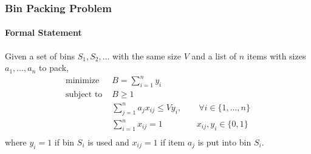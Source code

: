 \documentclass[10pt,    %
    english,            %
    xcolor=table,       %
    envcountsect,        %
    aspectratio=169     %
]{beamer}
\begin{document}
\begin{frame}
    \frametitle{Bin Packing Problem}
    \framesubtitle{Formal Statement}

    \vspace{-10pt}

    Given a set of bins $S_1, S_2, \dots$ with the same size $V$ and a list of $n$ items with sizes $a_1, \dots, a_n$ to pack,
    \begin{equation*}
        \begin{aligned}
            \text{minimize } & B = \sum\limits_{i = 1}^{n} y_i \\
            \text{subject to } & B \geq 1 \\
            & \sum\limits_{j = 1}^{n}a_jx_{ij} \leq V y_i, \quad \quad \forall i \in \lbrace 1, \dots, n\rbrace \\
            & \sum_{i = 1}^n x_{ij} = 1 \qquad \qquad x_{ij}, y_i \in \lbrace 0, 1 \rbrace \\
        \end{aligned}
    \end{equation*}
    \hspace{20pt} where $y_i = 1$ if bin $S_i$ is used and $x_{ij} = 1$ if item $a_j$ is put into bin $S_i$.

\end{frame}
\end{document}
